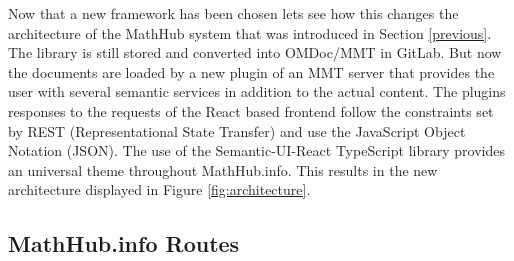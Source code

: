 \documentclass[11pt,a4paper]{article}
\begin{document}
Now that a new framework has been chosen lets see how this changes the architecture of the MathHub system that was introduced in Section \ref{previous}.
The library is still stored and converted into OMDoc/MMT in GitLab.
But now the documents are loaded by a new plugin of an MMT server that provides the user with several semantic services in addition to the actual content.
The plugins responses to the requests of the React based frontend follow the constraints set by REST (Representational State Transfer) and use the JavaScript Object Notation (JSON).
The use of the Semantic-UI-React TypeScript library provides an universal theme throughout MathHub.info.
This results in the new architecture displayed in Figure \ref{fig:architecture}.

\subsection{MathHub.info Routes} \label{routes}
\end{document}
